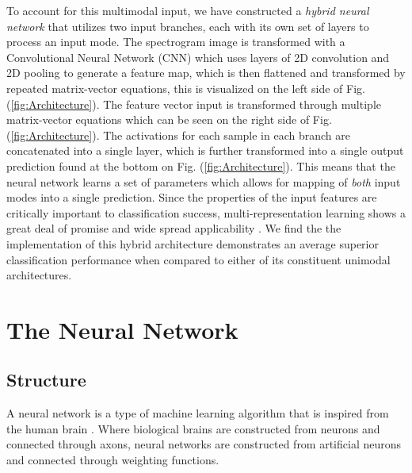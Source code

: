 \documentclass[conference,twocolumn,letterpaper]{IEEEtran}
\begin{document}
To account for this multimodal input, we have constructed a \textit{hybrid neural network} that utilizes two input branches, each with its own set of layers to process an input mode. The spectrogram image is transformed with a Convolutional Neural Network (CNN) which uses layers of 2D convolution and 2D pooling to generate a feature map, which is then flattened and transformed by repeated matrix-vector equations, this is visualized on the left side of Fig. (\ref{fig:Architecture}). The feature vector input is transformed through multiple matrix-vector equations which can be seen on the right side of Fig. (\ref{fig:Architecture}). The activations for each sample in each branch are concatenated into a single layer, which is further transformed into a single output prediction found at the bottom on Fig. (\ref{fig:Architecture}). This means that the neural network learns a set of parameters which allows for mapping of \textit{both} input modes into a single prediction. Since the properties of the input features are critically important to classification success, multi-representation learning shows a great deal of promise and wide spread applicability \cite{Khan,Li,Liu,Virtanen}. We find the the implementation of this hybrid architecture demonstrates an average superior classification performance when compared to either of its constituent unimodal architectures.


\section{The Neural Network}
\label{sec:NeuralNetwork}


\subsection{Structure}
\label{subsec:Intro}

A neural network is a type of machine learning algorithm that is inspired from the human brain \cite{Geron,Goodfellow}. Where biological brains are constructed from neurons and connected through axons, neural networks are constructed from artificial neurons and connected through weighting functions. 




\end{document}
